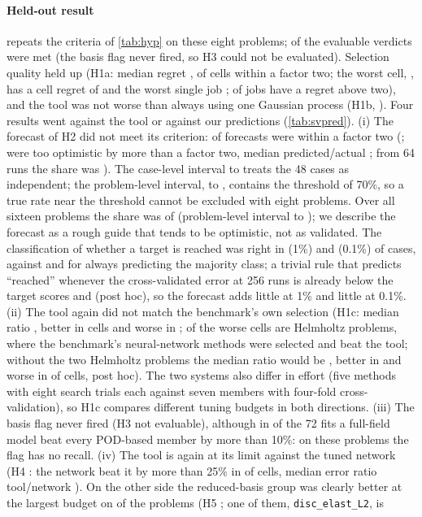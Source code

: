 \paragraph{Held-out result}  repeats the criteria of \cref{tab:hyp} on these eight problems; \SvMetCount{} of the \SvEvalCount{} evaluable verdicts were met (the basis flag never fired, so H3 could not be evaluated). Selection quality held up (H1a: median regret \SvSoneMedian, \SvSoneShare{} of cells within a factor two; the worst cell, \SvSthreeMaxWhere, has a cell regret of \SvSoneMax{} and the worst single job \SvWorstjob; \SvWorstjobOver{} of \SvWorstjobN{} jobs have a regret above two), and the tool was not worse than always using one Gaussian process (H1b, \SvStwoMedian). Four results went against the tool or against our predictions (\cref{tab:svpred}). (i) The forecast of H2 did not meet its criterion: \SvBoneK{} of \SvBoneN{} forecasts were within a factor two (\SvBoneShare; \SvBoneUnder{} were too optimistic by more than a factor two, median predicted/actual \SvBoneBias; from 64 runs the share was \SvBoneShareSixtyfour). The case-level interval \SvBoneLo{} to \SvBoneHi{} treats the 48 cases as independent; the problem-level interval, \SvPlBoneLo{} to \SvPlBoneHi, contains the threshold of 70\%, so a true rate near the threshold cannot be excluded with eight problems. Over all sixteen problems the share was \SvpBoneShare{} of \SvpBoneN{} (problem-level interval \SvpPlBoneLo{} to \SvpPlBoneHi); we describe the forecast as a rough guide that tends to be optimistic, not as validated. The classification of whether a target is reached was right in \SvBtwoOneAcc{} (1\%) and \SvBtwoTenthAcc{} (0.1\%) of cases, against \SvBtwoOneMajor{} and \SvBtwoTenthMajor{} for always predicting the majority class; a trivial rule that predicts ``reached'' whenever the cross-validated error at 256 runs is already below the target scores \SvCfOne{} and \SvCfTenth{} (post hoc), so the forecast adds little at 1\% and little at 0.1\%. (ii) The tool again did not match the benchmark's own selection (H1c: median ratio \SvSthreeMedian, better in \SvSthreeBetter{} cells and worse in \SvSthreeWorse; \SvSthreeWorseHelm{} of the worse cells are Helmholtz problems, where the benchmark's neural-network methods were selected and beat the tool; without the two Helmholtz problems the median ratio would be \SvNohSthree, better in \SvNohBetter{} and worse in \SvNohWorse{} of \SvNohN{} cells, post hoc). The two systems also differ in effort (five methods with eight search trials each against seven members with four-fold cross-validation), so H1c compares different tuning budgets in both directions. (iii) The basis flag never fired (H3 not evaluable), although in \SvHThreeFullBetter{} of the 72 fits a full-field model beat every POD-based member by more than 10\%: on these problems the flag has no recall. (iv) The tool is again at its limit against the tuned network (H4 \SvSfourVerdict: the network beat it by more than 25\% in \SvSfourK{} of \SvSfourN{} cells, median error ratio tool/network \SvSfourMedian). On the other side the reduced-basis group was clearly better at the largest budget on \SvPtK{} of the \SvPtN{} problems (H5 \SvPtVerdict; one of them, \texttt{disc\_elast\_L2}, is 